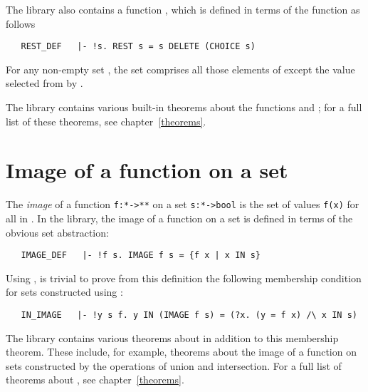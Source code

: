 The library also contains a function , which is defined in terms of
the  function as follows

\begin{hol}
\begin{verbatim}
   REST_DEF   |- !s. REST s = s DELETE (CHOICE s)
\end{verbatim}\end{hol}

\noindent For any non-empty set , the set  comprises all those
elements of  except the value selected from  by .

The library contains various built-in theorems about the functions 
and ; for a full list of these theorems, see chapter~\ref{theorems}.

\section{Image of a function on a set}

The {\it image\/} of a function {\small\verb!f:*->**!} on a set
{\small\verb!s:*->bool!} is the set of values {\small\verb!f(x)!} for all
 in .  In the  library, the image of a function on a
set is defined in terms of the obvious set abstraction:

\begin{hol}
\begin{verbatim}
   IMAGE_DEF   |- !f s. IMAGE f s = {f x | x IN s}
\end{verbatim}\end{hol}

\noindent Using , is trivial to prove from this
definition the following membership condition for sets constructed using
:

\begin{hol}
\begin{verbatim}
   IN_IMAGE   |- !y s f. y IN (IMAGE f s) = (?x. (y = f x) /\ x IN s)
\end{verbatim}\end{hol}

\noindent The  library contains various theorems about
 in addition to this membership theorem.  These include, for example,
theorems about the image of a function on sets constructed by the operations of
union and intersection.  For a full list of theorems about , see
chapter~\ref{theorems}.

